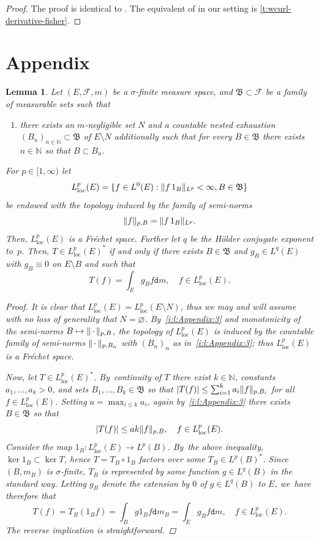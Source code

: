 \documentclass[10pt]{amsart}
\newcommand\mto{\mathchoice{\longmapsto}{\mapsto}{\mapsto}{\mapsto}}
\newtheorem{lemma}[theorem]{Lemma}
\theoremstyle{definition}
\theoremstyle{remark}
\DeclarePairedDelimiter{\set}{\lbrace}{\rbrace}
\DeclarePairedDelimiter{\abs}{\lvert}{\rvert}
\DeclarePairedDelimiter{\norm}{\lVert}{\rVert}
\newcommand{\emparg}{\,\cdot\,}
\begin{document}
\begin{proof}
The proof is identical to \cite[Th.\,7.3]{ErbarMaas}.
The equivalent of \cite[Prop.\,4.1]{ErbarMaas} in our setting is \cref{t:wcurl-derivative-fisher}.
\end{proof}

\section{Appendix}
\begin{lemma}\label{t:DualLLoc}
Let $(E,\mathscr{F},m)$ be a $\sigma$-finite measure space, and $\mathfrak{B}\subset \mathscr{F}$ be a family of measurable sets such that
\begin{enumerate}[$(\rm a)$, wide]
\item\label{i:l:Appendix:3} there exists an $m$-negligible set $N$ and a countable nested exhaustion \hbox{$(B_n)_{n\in\mathbb{N}}\subset \mathfrak{B}$} of $E\setminus N$ additionally such that for every $B\in\mathfrak{B}$ there exists $n\in\mathbb{N}$ so that $B\subset B_n$.
\end{enumerate}
For $p\in [1,\infty)$ let
\[
L^p_{\mathrm{loc}}(E)= \set{f\in L^0(E): \norm{f\, 1_B}_{L^p}<\infty , B\in\mathfrak{B}}
\]
be endowed with the topology induced by the family of semi-norms
\[
\norm{f}_{p,B}= \norm{f \, 1_B}_{L^p}.
\]
Then, $L^p_{\mathrm{loc}}(E)$ is a Fréchet space.
Further let $q$ be the Hölder conjugate exponent to~$p$. Then, $T\in L^p_{\mathrm{loc}}(E)^*$ if and only if there exists $B\in\mathfrak{B}$ and $g_B\in L^q(E)$ with $g_B\equiv 0$ on $E\setminus B$ and such that
\[
T(f)=\int_E g_B f \mathtt{d} m, \quad f\in L^p_{\mathrm{loc}}(E).
\]
\begin{proof}
It is clear that $L^p_{\mathrm{loc}}(E)=L^p_{\mathrm{loc}}(E\setminus N)$, thus we may and will assume with no loss of generality that $N=\varnothing$.
By~\cref{i:l:Appendix:3} and monotonicity of the semi-norms $B\mto \norm{\emparg}_{p,B}$, the topology of $L^p_{\mathrm{loc}}(E)$ is induced by the countable family of semi-norms $\norm{\emparg}_{p,B_n}$ with $(B_n)_n$ as in~\cref{i:l:Appendix:3}; thus $L^p_{\mathrm{loc}}(E)$ is a Fréchet space.

Now, let $T\!\in\! L^p_{\mathrm{loc}}(E)^*$. By~continuity of $T$ there exist $k\!\in\!\mathbb{N}$, constants $a_1,\dotsc,a_k\!>\!0$, and sets $B_1,\dotsc, B_k\in\mathfrak{B}$ so that $\abs{T(f)}\leq \sum_{i=1}^k a_i \norm{f}_{p,B_i}$ for all $f\in L^p_{\mathrm{loc}}(E)$.
Setting $a= \max_{i\leq k} a_i$, again by~\cref{i:l:Appendix:3} there exists $B\in\mathfrak{B}$ so that
\[
\abs{T(f)}\leq a k \norm{f}_{p,B} , \quad f \in L^p_{\mathrm{loc}}(E).
\]
Consider the map $1_B\colon L^p_{\mathrm{loc}}(E)\to L^p(B)$.
By~the above inequality, $\ker 1_B\subset \ker T$, hence $T=T_B\circ 1_B$ factors over some $T_B\in L^p(B)^*$.
Since $(B,m_B)$ is $\sigma$-finite, $T_B$ is represented by some function $g\in L^q(B)$ in the standard way.
Letting $g_B$ denote the extension by $0$ of $g\in L^q(B)$ to $E$, we~have therefore that
\[
T(f)=T_B (1_B f)=\int_B g 1_B f \mathtt{d} m_B= \int_E g_B f \mathtt{d} m, \quad f\in L^p_{\mathrm{loc}}(E).
\]
The reverse implication is straightforward.
\end{proof}
\end{lemma}
\end{document}

